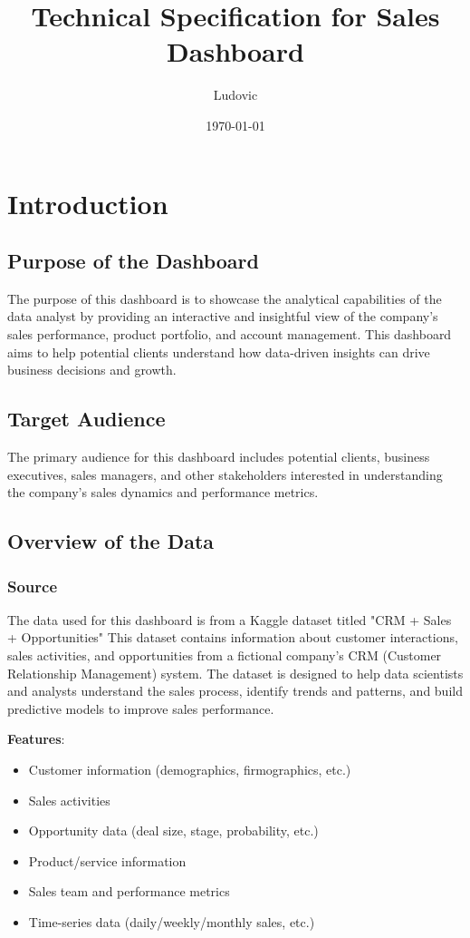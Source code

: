 \documentclass{article}
\title{Technical Specification for Sales Dashboard}
\author{Ludovic}
\date{\today}
\begin{document}
\maketitle

\section{Introduction}

\subsection{Purpose of the Dashboard}
The purpose of this dashboard is to showcase the analytical capabilities of the data analyst by providing an interactive and insightful view of the company’s sales performance, product portfolio, and account management. This dashboard aims to help potential clients understand how data-driven insights can drive business decisions and growth.



\subsection{Target Audience}
The primary audience for this dashboard includes potential clients, business executives, sales managers, and other stakeholders interested in understanding the company's sales dynamics and performance metrics.

\subsection{Overview of the Data}
\subsubsection{Source}
The data used for this dashboard is from a Kaggle dataset titled "CRM + Sales + Opportunities" This dataset contains information about customer interactions, sales activities, and opportunities from a fictional company's CRM (Customer Relationship Management) system. The dataset is designed to help data scientists and analysts understand the sales process, identify trends and patterns, and build predictive models to improve sales performance.

\textbf{Features}:
\begin{itemize}
    \item Customer information (demographics, firmographics, etc.)
    \item Sales activities
    \item Opportunity data (deal size, stage, probability, etc.)
    \item Product/service information
    \item Sales team and performance metrics
    \item Time-series data (daily/weekly/monthly sales, etc.)
\end{itemize}
\end{document}
